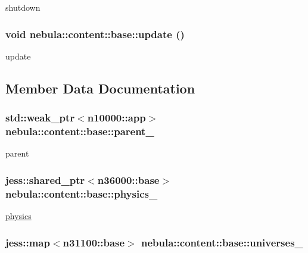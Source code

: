 shutdown \hypertarget{classnebula_1_1content_1_1base_ad000db68eff36d8c55edfb97e37f83a6}{
\subsubsection[{update}]{\setlength{\rightskip}{0pt plus 5cm}void nebula::content::base::update ()}}
\label{classnebula_1_1content_1_1base_ad000db68eff36d8c55edfb97e37f83a6}


update 

\subsection{Member Data Documentation}
\hypertarget{classnebula_1_1content_1_1base_ab7f8a88f261f696ea47b1b6573181754}{
\subsubsection[{parent\_\-}]{\setlength{\rightskip}{0pt plus 5cm}std::weak\_\-ptr$<${\bf n10000::app}$>$ {\bf nebula::content::base::parent\_\-}}}
\label{classnebula_1_1content_1_1base_ab7f8a88f261f696ea47b1b6573181754}


parent \hypertarget{classnebula_1_1content_1_1base_af90e41b1076f7ebcba28e330e7193616}{
\subsubsection[{physics\_\-}]{\setlength{\rightskip}{0pt plus 5cm}jess::shared\_\-ptr$<${\bf n36000::base}$>$ {\bf nebula::content::base::physics\_\-}}}
\label{classnebula_1_1content_1_1base_af90e41b1076f7ebcba28e330e7193616}


\hyperlink{namespacenebula_1_1content_1_1physics}{physics} \hypertarget{classnebula_1_1content_1_1base_aabc7b7583feb3bf497d161d67f2f908e}{
\subsubsection[{universes\_\-}]{\setlength{\rightskip}{0pt plus 5cm}jess::map$<${\bf n31100::base}$>$ {\bf nebula::content::base::universes\_\-}}}
\label{classnebula_1_1content_1_1base_aabc7b7583feb3bf497d161d67f2f908e}



